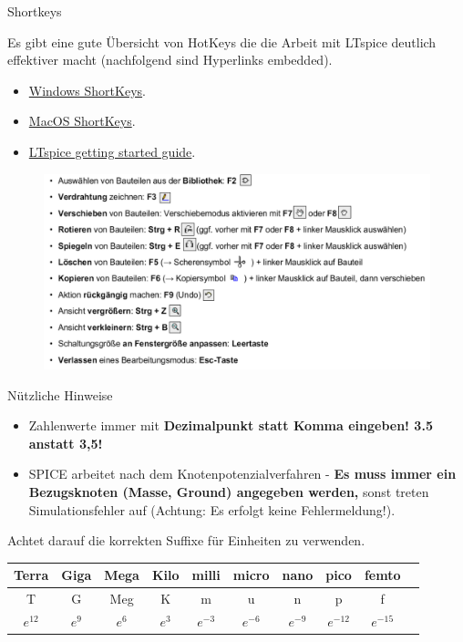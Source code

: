 \documentclass{beamer}
\begin{document}
\begin{frame}[t]{Shortkeys}
	
Es gibt eine gute Übersicht von HotKeys die die Arbeit mit LTspice deutlich effektiver macht (nachfolgend sind Hyperlinks embedded).

\begin{itemize}
  \item \href{https://www.analog.com/media/en/simulation-models/spice-models/LTspice_ShortcutFlyer.pdf?modelType=spice-models}{Windows ShortKeys}.
  \item \href{https://www.analog.com/media/en/simulation-models/spice-models/LTspiceShortcutsForMacOSX.pdf?modelType=spice-models}{MacOS ShortKeys}.
  \item \href{https://www.analog.com/media/en/simulation-models/spice-models/LTspiceGettingStartedGuide.pdf?modelType=spice-models}{LTspice getting started guide}.
\end{itemize}

\begin{figure}
  \centering
  \includegraphics[scale=0.25]{pictures/shortkeys.png}
\end{figure}

\end{frame}

\begin{frame}[t]{Nützliche Hinweise}

  \begin{itemize}
    \item Zahlenwerte immer mit \textbf{Dezimalpunkt statt Komma eingeben! 3.5 anstatt 3,5!}
    \item SPICE arbeitet nach dem Knotenpotenzialverfahren - \textbf{Es muss immer ein Bezugsknoten
          (Masse, Ground) angegeben werden,} sonst treten Simulationsfehler auf (Achtung: Es erfolgt
          keine Fehlermeldung!).
  \end{itemize}
  Achtet darauf die korrekten Suffixe für Einheiten zu verwenden.

  \begin{tabular}{| c | c | c | c | c | c | c | c | c | c |}
    \hline
    Terra & Giga & Mega & Kilo & milli & micro & nano & pico & femto \\
    \hline
    T & G & Meg & K & m & u & n & p & f \\
    \hline
    $e^{12}$ & $e^{9}$ & $e^{6}$ &  $e^{3}$ & $e^{-3}$ & $e^{-6}$ & $e^{-9}$ & $e^{-12}$ & $e^{-15}$\\
    \hline
  \end{tabular}
\end{frame}
\end{document}
